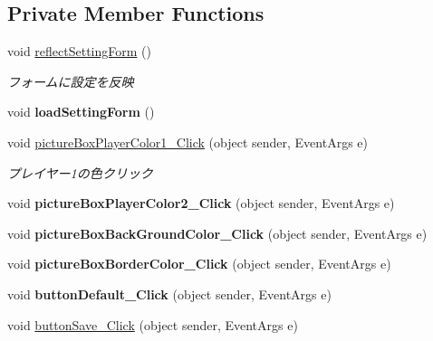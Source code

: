 \subsection*{Private Member Functions}
\begin{DoxyCompactItemize}
\item 
void \hyperlink{class_reversi_form_1_1_setting_form_a7ede223d806bde4aeb790ade207ad677}{reflect\+Setting\+Form} ()
\begin{DoxyCompactList}\small\item\em フォームに設定を反映 \end{DoxyCompactList}\item 
\mbox{\label{class_reversi_form_1_1_setting_form_acfeb6909caeb02f9609a2527f28764de}} 
void {\bfseries load\+Setting\+Form} ()
\item 
void \hyperlink{class_reversi_form_1_1_setting_form_a71422ab30aabb52bdc6f25b5e84aefea}{picture\+Box\+Player\+Color1\+\_\+\+Click} (object sender, Event\+Args e)
\begin{DoxyCompactList}\small\item\em プレイヤー1の色クリック \end{DoxyCompactList}\item 
\mbox{\label{class_reversi_form_1_1_setting_form_a90114bcff5766716a94ad22185d82697}} 
void {\bfseries picture\+Box\+Player\+Color2\+\_\+\+Click} (object sender, Event\+Args e)
\item 
\mbox{\label{class_reversi_form_1_1_setting_form_a212a9ff801c99e4d7f9451fc18edb63c}} 
void {\bfseries picture\+Box\+Back\+Ground\+Color\+\_\+\+Click} (object sender, Event\+Args e)
\item 
\mbox{\label{class_reversi_form_1_1_setting_form_aa16902463ec305211753be49e1938e30}} 
void {\bfseries picture\+Box\+Border\+Color\+\_\+\+Click} (object sender, Event\+Args e)
\item 
\mbox{\label{class_reversi_form_1_1_setting_form_ae22d040f38a25716002131a4f82a2a54}} 
void {\bfseries button\+Default\+\_\+\+Click} (object sender, Event\+Args e)
\item 
void \hyperlink{class_reversi_form_1_1_setting_form_aba7b2ad370dba451133448e702cf0944}{button\+Save\+\_\+\+Click} (object sender, Event\+Args e)

\end{DoxyCompactItemize}

